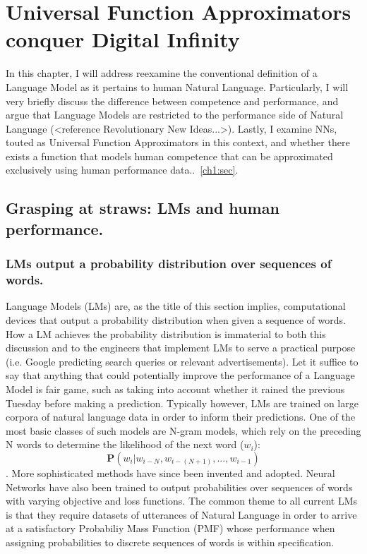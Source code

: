\chapter{Universal Function Approximators conquer Digital Infinity}

In this chapter, I will address reexamine the conventional definition of a Language Model as it pertains to human Natural Language.  Particularly, I will very briefly discuss the difference between competence and performance, and argue that Language Models are restricted to the performance side of Natural Language (<reference Revolutionary New Ideas...>).  Lastly, I examine NNs, touted as Universal Function Approximators in this context, and whether there exists a function that models human competence that can be approximated exclusively using human performance data..~\ref{ch1:sec}.

\section*{Grasping at straws: LMs and human performance.}

\subsection*{LMs output a probability distribution over sequences of words.}

Language Models (LMs) are, as the title of this section implies, computational devices that output a probability distribution when given a sequence of words.  How a LM achieves the probability distribution is immaterial to both this discussion and to the engineers that implement LMs to serve a practical purpose (i.e. Google predicting search queries or relevant advertisements).  Let it suffice to say that anything that could potentially improve the performance of a Language Model is fair game, such as taking into account whether it rained the previous Tuesday before making a prediction.  Typically however, LMs are trained on large corpora of natural language data in order to inform their predictions.  One of the most basic classes of such models are N-gram models, which rely on the preceding N words to determine the likelihood of the next word ($w_i$): $$\mathbf{P}(w_i|w_{i-N}, w_{i-(N+1)}, ..., w_{i-1})$$.  More sophisticated methods have since been invented and adopted.  Neural Networks have also been trained to output probabilities over sequences of words with varying objective and loss functions.  The common theme to all current LMs is that they require datasets of utterances of Natural Language in order to arrive at a satisfactory Probabiliy Mass Function (PMF) whose performance when assigning probabilities to discrete sequences of words is within specification.


